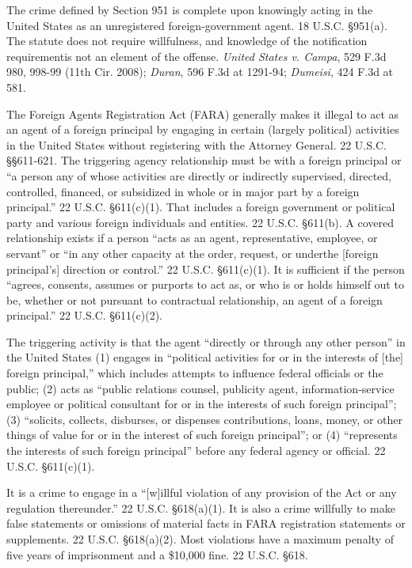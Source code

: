 The crime defined by Section 951 is complete upon knowingly acting in the United States as an unregistered foreign-government agent. 
18 U.S.C. \S 951(a). 
The statute does not require willfulness, and knowledge of the notification requirementis not an element of the offense. 
\textit{United States v. Campa}, 529 F.3d 980, 998-99 (11th Cir. 2008); \textit{Duran}, 596 F.3d at 1291-94; \textit{Dumeisi}, 424 F.3d at 581.

The Foreign Agents Registration Act (FARA) generally makes it illegal to act as an agent of a foreign principal by engaging in certain (largely political) activities in the United States without registering with the Attorney General. 22 U.S.C. \S\S 611-621. The triggering agency relationship must be with a foreign principal or ``a person any of whose activities are directly or indirectly supervised, directed, controlled, financed, or subsidized in whole or in major part by a foreign principal.'' 22 U.S.C. \S 611(c)(1). 
That includes a foreign government or political party and various foreign individuals and entities. 
22 U.S.C. \S 611(b). 
A covered relationship exists if a person ``acts as an agent, representative, employee, or servant'' or ``in any other capacity at the order, request, or underthe [foreign principal's] direction or control.'' 
22 U.S.C. \S 611(c)(1). 
It is sufficient if the person ``agrees, consents, assumes or purports to act as, or who is or holds himself out to be, whether or not pursuant to contractual relationship, an agent of a foreign principal.'' 
22 U.S.C. \S 611(c)(2).

The triggering activity is that the agent ``directly or through any other person'' in the United States (1) engages in ``political activities for or in the interests of [the] foreign principal,'' which includes attempts to influence federal officials or the public; (2) acts as ``public relations counsel, publicity agent, information-service employee or political consultant for or in the interests of such foreign principal''; (3) ``solicits, collects, disburses, or dispenses contributions, loans, money, or other things of value for or in the interest of such foreign principal''; or (4) ``represents the interests of such foreign principal'' before any federal agency or official. 
22 U.S.C. \S 611(c)(1).

It is a crime to engage in a ``[w]illful violation of any provision of the Act or any regulation thereunder.''
22 U.S.C. \S 618(a)(1). 
It is also a crime willfully to make false statements or omissions of material facts in FARA registration statements or supplements. 
22 U.S.C. \S 618(a)(2). 
Most violations have a maximum penalty of five years of imprisonment and a \$10,000 fine. 
22 U.S.C. \S 618.

